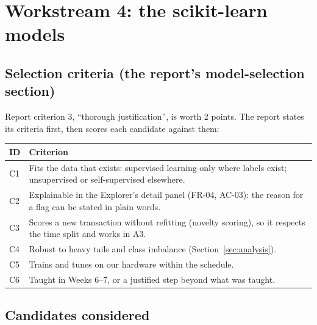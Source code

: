 \section{Workstream 4: the scikit-learn models}
\label{sec:models}

\subsection{Selection criteria (the report's model-selection section)}

Report criterion 3, ``thorough justification'', is worth 2 points. The report states its criteria
first, then scores each candidate against them:

\begin{center}
\small
\begin{tabularx}{\textwidth}{@{}L{0.8cm}Y@{}}
\toprule
\textbf{ID} & \textbf{Criterion} \\
\midrule
C1 & Fits the data that exists: supervised learning only where labels exist; unsupervised or self-supervised elsewhere. \\
C2 & Explainable in the Explorer's detail panel (FR-04, AC-03): the reason for a flag can be stated in plain words. \\
C3 & Scores a new transaction without refitting (novelty scoring), so it respects the time split and works in A3. \\
C4 & Robust to heavy tails and class imbalance (Section~\ref{sec:analysis}). \\
C5 & Trains and tunes on our hardware within the schedule. \\
C6 & Taught in Weeks 6--7, or a justified step beyond what was taught. \\
\bottomrule
\end{tabularx}
\end{center}

\subsection{Candidates considered}

